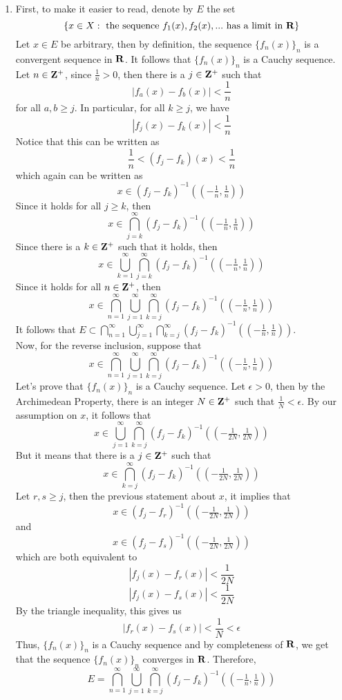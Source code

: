 \begin{solution}
    \begin{enumerate}[label = (\alph*)]
        \item First, to make it easier to read, denote by $E$ the set $$\{x \in X : \text{ the sequence } f_1(x), f_2(x), ... \text{ has a limit in } \mathbf{R} \}$$
        Let $x \in E$ be arbitrary, then by definition, the sequence $\{f_n(x)\}_n$ is a convergent sequence in $\mathbf{R}$. It follows that $\{f_n(x)\}_n$ is a Cauchy sequence. Let $n \in \mathbf{Z}^+$, since $\frac{1}{n} > 0$, then there is a $j \in \mathbf{Z}^+$ such that 
        $$|f_a(x) - f_b(x)| < \frac{1}{n}$$
        for all $a,b \geq j$. In particular, for all $k \geq j$, we have
        $$|f_j(x) - f_k(x)| < \frac{1}{n}$$
        Notice that this can be written as
        $$\frac{1}{n} < (f_j - f_k)(x) < \frac{1}{n}$$
        which again can be written as
        $$x \in (f_j - f_k)^{-1}((-\tfrac{1}{n}, \tfrac{1}{n}))$$
        Since it holds for all $j \geq k$, then
        $$x \in \bigcap_{j = k}^{\infty}(f_j - f_k)^{-1}((-\tfrac{1}{n}, \tfrac{1}{n}))$$
        Since there is a $k \in \mathbf{Z}^+$ such that it holds, then
        $$x \in \bigcup_{k=1}^{\infty} \bigcap_{j = k}^{\infty}(f_j - f_k)^{-1}((-\tfrac{1}{n}, \tfrac{1}{n}))$$
        Since it holds for all $n \in \mathbf{Z}^+$, then
        $$x \in \bigcap_{n=1}^{\infty}\bigcup_{j=1}^{\infty}\bigcap_{k=j}^{\infty}(f_j - f_k)^{-1}((- \tfrac{1}{n}, \tfrac{1}{n}))$$
        It follows that $E \subset \bigcap_{n=1}^{\infty}\bigcup_{j=1}^{\infty}\bigcap_{k=j}^{\infty}(f_j - f_k)^{-1}((- \tfrac{1}{n}, \tfrac{1}{n}))$. \\
        Now, for the reverse inclusion, suppose that
        $$x \in \bigcap_{n=1}^{\infty}\bigcup_{j=1}^{\infty}\bigcap_{k=j}^{\infty}(f_j - f_k)^{-1}((- \tfrac{1}{n}, \tfrac{1}{n}))$$
        Let's prove that $\{f_n(x)\}_n$ is a Cauchy sequence. Let $\epsilon > 0$, then by the Archimedean Property, there is an integer $N \in \mathbf{Z}^+$ such that $\frac{1}{N} < \epsilon$. By our assumption on $x$, it follows that
        $$x \in \bigcup_{j=1}^{\infty}\bigcap_{k=j}^{\infty}(f_j - f_k)^{-1}((- \tfrac{1}{2N}, \tfrac{1}{2N}))$$
        But it means that there is a $j \in \mathbf{Z}^+$ such that
        $$x \in \bigcap_{k=j}^{\infty}(f_j - f_k)^{-1}((- \tfrac{1}{2N}, \tfrac{1}{2N}))$$
        Let $r, s \geq j$, then the previous statement about $x$, it implies that
        $$x \in (f_j - f_r)^{-1}((- \tfrac{1}{2N}, \tfrac{1}{2N}))$$
        and
        $$x \in (f_j - f_s)^{-1}((- \tfrac{1}{2N}, \tfrac{1}{2N}))$$
        which are both equivalent to 
        $$|f_j(x) - f_r(x)| < \frac{1}{2N}$$
        $$|f_j(x) - f_s(x)| < \frac{1}{2N}$$
        By the triangle inequality, this gives us 
        $$|f_r(x) - f_s(x)| < \frac{1}{N} < \epsilon$$
        Thus, $\{f_n(x)\}_n$ is a Cauchy sequence and by completeness of $\mathbf{R}$, we get that the sequence $\{f_n(x)\}_n$ converges in $\mathbf{R}$.
        Therefore, 
        $$E = \bigcap_{n=1}^{\infty}\bigcup_{j=1}^{\infty}\bigcap_{k=j}^{\infty}(f_j - f_k)^{-1}((- \tfrac{1}{n}, \tfrac{1}{n}))$$


\end{enumerate}
\end{solution}

